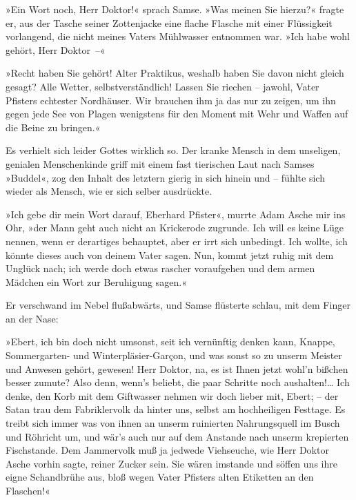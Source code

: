 »Ein Wort noch, Herr Doktor!« sprach Samse. »Was meinen Sie
hierzu?« fragte er, aus der Tasche seiner Zottenjacke eine flache
Flasche mit einer Flüssigkeit vorlangend, die nicht meines Vaters
Mühlwasser entnommen war. »Ich habe wohl gehört, Herr Doktor~–«

»Recht haben Sie gehört! Alter Praktikus, weshalb haben Sie davon
nicht gleich gesagt? Alle Wetter, selbstverständlich! Lassen Sie
riechen – jawohl, Vater Pfisters echtester Nordhäuser. Wir brauchen
ihm ja das nur zu zeigen, um ihn gegen jede See von Plagen
wenigstens für den Moment mit Wehr und Waffen auf die Beine zu
bringen.«

Es verhielt sich leider Gottes wirklich so. Der kranke Mensch in
dem unseligen, genialen Menschenkinde griff mit einem fast
tierischen Laut nach Samses »Buddel«, zog den Inhalt des letztern
gierig in sich hinein und – fühlte sich wieder als Mensch, wie er
sich selber ausdrückte.

»Ich gebe dir mein Wort darauf, Eberhard Pfister«, murrte Adam
Asche mir ins Ohr, »der Mann geht auch nicht an Krickerode
zugrunde. Ich will es keine Lüge nennen, wenn er derartiges
behauptet, aber er irrt sich unbedingt. Ich wollte, ich könnte
dieses auch von deinem Vater sagen. Nun, kommt jetzt ruhig mit dem
Unglück nach; ich werde doch etwas rascher voraufgehen und dem
armen Mädchen ein Wort zur Beruhigung sagen.«

Er verschwand im Nebel flußabwärts, und Samse flüsterte schlau, mit
dem Finger an der Nase:

»Ebert, ich bin doch nicht umsonst, seit ich vernünftig denken
kann, Knappe, Sommergarten- und Winterpläsier-Garçon, und was sonst
so zu unserm Meister und Anwesen gehört, gewesen! Herr Doktor, na,
es ist Ihnen jetzt wohl'n bißchen besser zumute? Also denn, wenn's
beliebt, die paar Schritte noch aushalten!\ldots{} Ich denke, den Korb
mit dem Giftwasser nehmen wir doch lieber mit, Ebert; – der Satan
trau dem Fabriklervolk da hinter uns, selbst am hochheiligen
Festtage. Es treibt sich immer was von ihnen an unserm ruinierten
Nahrungsquell im Busch und Röhricht um, und wär's auch nur auf dem
Anstande nach unserm krepierten Fischstande. Dem Jammervolk muß ja
jedwede Viehseuche, wie Herr Doktor Asche vorhin sagte, reiner
Zucker sein. Sie wären imstande und söffen uns ihre eigne
Schandbrühe aus, bloß wegen Vater Pfisters alten Etiketten an den
Flaschen!«

